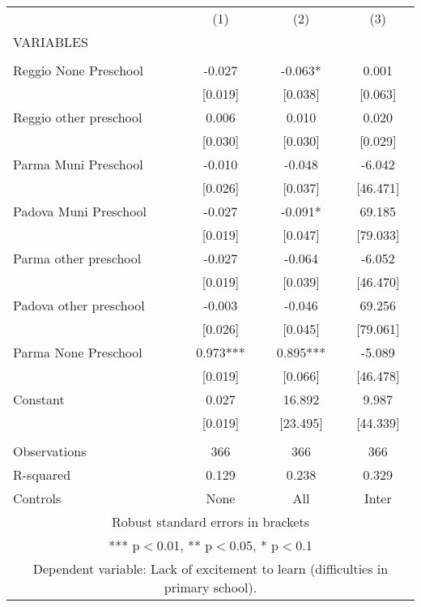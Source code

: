 \begin{tabular}{lccc} \hline
 & (1) & (2) & (3) \\
VARIABLES &  &  &  \\ \hline
 &  &  &  \\
Reggio None Preschool & -0.027 & -0.063* & 0.001 \\
 & [0.019] & [0.038] & [0.063] \\
Reggio other preschool & 0.006 & 0.010 & 0.020 \\
 & [0.030] & [0.030] & [0.029] \\
Parma Muni Preschool & -0.010 & -0.048 & -6.042 \\
 & [0.026] & [0.037] & [46.471] \\
Padova Muni Preschool & -0.027 & -0.091* & 69.185 \\
 & [0.019] & [0.047] & [79.033] \\
Parma other preschool & -0.027 & -0.064 & -6.052 \\
 & [0.019] & [0.039] & [46.470] \\
Padova other preschool & -0.003 & -0.046 & 69.256 \\
 & [0.026] & [0.045] & [79.061] \\
Parma None Preschool & 0.973*** & 0.895*** & -5.089 \\
 & [0.019] & [0.066] & [46.478] \\
Constant & 0.027 & 16.892 & 9.987 \\
 & [0.019] & [23.495] & [44.339] \\
 &  &  &  \\
Observations & 366 & 366 & 366 \\
R-squared & 0.129 & 0.238 & 0.329 \\
 Controls & None & All & Inter \\ \hline
\multicolumn{4}{c}{ Robust standard errors in brackets} \\
\multicolumn{4}{c}{ *** p$<$0.01, ** p$<$0.05, * p$<$0.1} \\
\multicolumn{4}{c}{ Dependent variable: Lack of excitement to learn (difficulties in primary school).} \\
\end{tabular}

